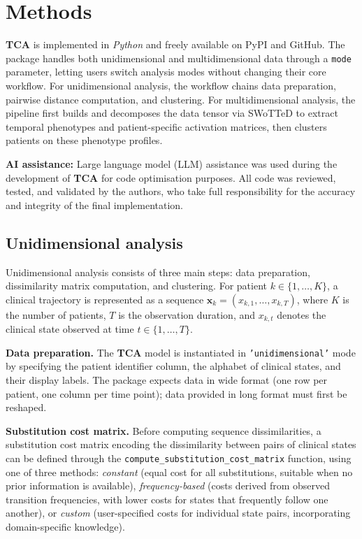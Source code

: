 \documentclass[a4paper]{cas-sc}
\newcommand{\proglang}[1]{\textit{#1}}
\newcommand{\code}[1]{\texttt{#1}}
\newcommand{\pkg}[1]{\textbf{#1}}
\begin{document}
\section{Methods}\label{sec:implementation}

\pkg{TCA} is implemented in \proglang{Python} and freely available on PyPI and GitHub. 
The package handles both unidimensional and multidimensional data through a \code{mode} parameter, letting users switch analysis modes without changing their core workflow. 
For unidimensional analysis, the workflow chains data preparation, pairwise distance computation, and clustering. 
For multidimensional analysis, the pipeline first builds and decomposes the data tensor via SWoTTeD to extract temporal phenotypes and patient-specific activation matrices, then clusters patients on these phenotype profiles.

\textbf{AI assistance:} Large language model (LLM) assistance was used during the development of \pkg{TCA} for code optimisation purposes.
All code was reviewed, tested, and validated by the authors, who take full responsibility for the accuracy and integrity of the final implementation.

\subsection{Unidimensional analysis}\label{sec:uni}

Unidimensional analysis consists of three main steps: data preparation, dissimilarity matrix computation, and clustering.
For patient $k \in \{1,\ldots,K\}$, a clinical trajectory is represented as a sequence
$\boldsymbol{x}_k = (x_{k,1}, \ldots, x_{k,T})$, where $K$ is the number of patients, $T$ is the observation duration, and $x_{k,t}$ denotes the clinical state observed at time $t \in \{1,\ldots,T\}$.

\textbf{Data preparation.}
The \pkg{TCA} model is instantiated in \code{'unidimensional'} mode by specifying the patient identifier column, the alphabet of clinical states, and their display labels. 
The package expects data in wide format (one row per patient, one column per time point); data provided in long format must first be reshaped.

\textbf{Substitution cost matrix.}
Before computing sequence dissimilarities, a substitution cost matrix encoding the dissimilarity between pairs of clinical states can be defined through the \code{compute\_substitution\_cost\_matrix} function, using one of three methods: 
\emph{constant} (equal cost for all substitutions, suitable when no prior information is available), 
\emph{frequency-based} (costs derived from observed transition frequencies, with lower costs for states that frequently follow one another), 
or \emph{custom} (user-specified costs for individual state pairs, incorporating domain-specific knowledge).
\end{document}
